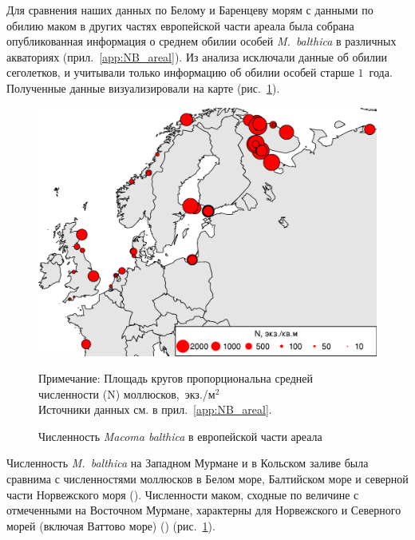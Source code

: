 
Для сравнения наших данных по Белому и Баренцеву морям с данными по обилию маком в других частях европейской части ареала была собрана опубликованная информация о среднем обилии особей {\it M.~balthica} в различных акваториях (прил.~\ref{app:NB_areal}). 
Из анализа исключали данные об обилии сеголетков, и учитывали только информацию об обилии особей старше $1$~года.
Полученные данные визуализировали на карте (рис.~\ref{ris:N_macrodistribution}).
	\begin{figure}[p]
    \includegraphics[width=\textwidth]{../macrodistribution/Nmean_ru1.pdf}
    \caption{Численность {\it Macoma balthica} в европейской части ареала}

{\footnotesize Примечание: Площадь кругов пропорциональна средней численности (N) моллюсков,~экз./м$^2$\\
Источники данных см. в прил.~\ref{app:NB_areal}.}
    \label{ris:N_macrodistribution}
	\end{figure}
Численность {\it M.~balthica} на Западном Мурмане и в Кольском заливе была сравнима с численностями моллюсков в Белом море, Балтийском море и северной части Норвежского моря (\cite{Semenova_1974, Aschan_1988, Maximovich_et_al_1991, Bonsdorff_et_al_1995, Bostrom_Bonsdorff_2000, Oug_2001, Laine_et_al_2003, Khaitov_et_al_2007, Varfolomeeva_Naumov_2013}).
Численности маком, сходные по величине с отмеченными на Восточном Мурмане, характерны для Норвежского и Северного морей (включая Ваттово море) (\cite{Brady_1943, Sneli_1968, Stromgren_et_al_1973, Beukema_1976, Jensen_Jensen_1985, Jensen_et_al_1985, Madsen_Jensen_1987, Beukema_1979, Zwarts_Wanink_1993, Reise_et_al_1994}) (рис.~\ref{ris:N_macrodistribution}).


